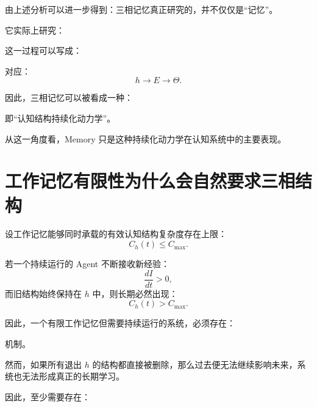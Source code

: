 由上述分析可以进一步得到：三相记忆真正研究的，并不仅仅是“记忆”。

它实际上研究：
\begin{statementbox}
\centering
{}
\end{statementbox}

这一过程可以写成：
\begin{statementbox}
\centering
{}
\end{statementbox}

对应：
\[
\boxed{
h
\rightarrow
E
\rightarrow
\Theta.
}
\]

因此，三相记忆可以被看成一种：
\begin{statementbox}
\centering
{}
\end{statementbox}

即“认知结构持续化动力学”。

从这一角度看，Memory 只是这种持续化动力学在认知系统中的主要表现。

\section{工作记忆有限性为什么会自然要求三相结构}

设工作记忆能够同时承载的有效认知结构复杂度存在上限：
\[
C_h(t)\le C_{\max}.
\]

若一个持续运行的 Agent 不断接收新经验：
\[
\frac{dI}{dt}>0,
\]
而旧结构始终保持在 $h$ 中，则长期必然出现：
\[
C_h(t)>C_{\max}.
\]

因此，一个有限工作记忆但需要持续运行的系统，必须存在：
\begin{statementbox}
\centering
{}
\end{statementbox}
机制。

然而，如果所有退出 $h$ 的结构都直接被删除，那么过去便无法继续影响未来，系统也无法形成真正的长期学习。

因此，至少需要存在：
\begin{statementbox}
\centering
{}
\end{statementbox}

